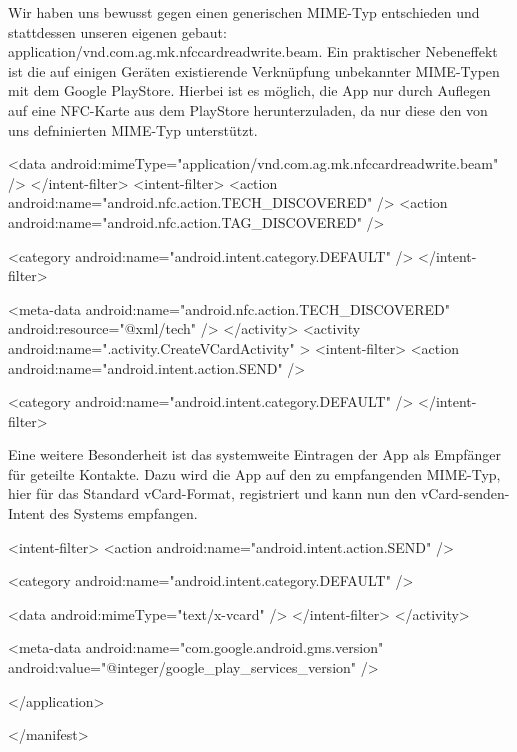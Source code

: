\documentclass[a4paper,ngerman,12pt]{scrreprt}
\newcommand{\+}{\discretionary{\mbox{\scriptsize$\hookleftarrow$}}{}{}}
\begin{document}
Wir haben uns bewusst gegen einen generischen M\+I\+M\+E-\/\+Typ entschieden und stattdessen unseren eigenen gebaut:  application/vnd.\+com.\+ag.\+mk.\+nfccardreadwrite.\+beam. Ein praktischer Nebeneffekt ist die auf einigen Geräten existierende Verknüpfung unbekannter M\+I\+M\+E-\/\+Typen mit dem Google Play\+Store. Hierbei ist es möglich, die App nur durch Auflegen auf eine N\+F\+C-\/\+Karte aus dem Play\+Store herunterzuladen, da nur diese den von uns defninierten M\+I\+M\+E-\/\+Typ unterstützt. \begin{DoxyVerb}                <data android:mimeType="application/vnd.com.ag.mk.nfccardreadwrite.beam" />
            </intent-filter>
            <intent-filter>
                <action android:name="android.nfc.action.TECH_DISCOVERED" />
                <action android:name="android.nfc.action.TAG_DISCOVERED" />

                <category android:name="android.intent.category.DEFAULT" />
            </intent-filter>

            <meta-data
                android:name="android.nfc.action.TECH_DISCOVERED"
                android:resource="@xml/tech" />
        </activity>
        <activity android:name=".activity.CreateVCardActivity" >
            <intent-filter>
                <action android:name="android.intent.action.SEND" />

                <category android:name="android.intent.category.DEFAULT" />
            </intent-filter>
\end{DoxyVerb}


Eine weitere Besonderheit ist das systemweite Eintragen der App als Empfänger für geteilte Kontakte. Dazu wird die App auf den zu empfangenden M\+I\+M\+E-\/\+Typ, hier für das Standard v\+Card-\/\+Format, registriert und kann nun den v\+Card-\/senden-\/\+Intent des Systems empfangen.

\begin{DoxyVerb}            <intent-filter>
                <action android:name="android.intent.action.SEND" />

                <category android:name="android.intent.category.DEFAULT" />

                <data android:mimeType="text/x-vcard" />
            </intent-filter>
        </activity>

        <meta-data
            android:name="com.google.android.gms.version"
            android:value="@integer/google_play_services_version" />

    </application>

</manifest>
\end{DoxyVerb}
\end{document}
